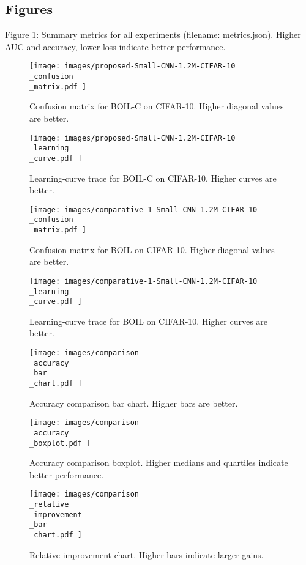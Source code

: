 \documentclass{article} %
\begin{document}
\subsection{Figures}
Figure 1: Summary metrics for all experiments (filename: metrics.json). Higher AUC and accuracy, lower loss indicate better performance.

\begin{figure}[H]
  \centering
  \texttt{[image:  images/proposed-Small-CNN-1.2M-CIFAR-10\\\_confusion\\\_matrix.pdf ]}
  \caption{Confusion matrix for BOIL-C on CIFAR-10. Higher diagonal values are better.}
\end{figure}

\begin{figure}[H]
  \centering
  \texttt{[image:  images/proposed-Small-CNN-1.2M-CIFAR-10\\\_learning\\\_curve.pdf ]}
  \caption{Learning-curve trace for BOIL-C on CIFAR-10. Higher curves are better.}
\end{figure}

\begin{figure}[H]
  \centering
  \texttt{[image:  images/comparative-1-Small-CNN-1.2M-CIFAR-10\\\_confusion\\\_matrix.pdf ]}
  \caption{Confusion matrix for BOIL on CIFAR-10. Higher diagonal values are better.}
\end{figure}

\begin{figure}[H]
  \centering
  \texttt{[image:  images/comparative-1-Small-CNN-1.2M-CIFAR-10\\\_learning\\\_curve.pdf ]}
  \caption{Learning-curve trace for BOIL on CIFAR-10. Higher curves are better.}
\end{figure}

\begin{figure}[H]
  \centering
  \texttt{[image:  images/comparison\\\_accuracy\\\_bar\\\_chart.pdf ]}
  \caption{Accuracy comparison bar chart. Higher bars are better.}
\end{figure}

\begin{figure}[H]
  \centering
  \texttt{[image:  images/comparison\\\_accuracy\\\_boxplot.pdf ]}
  \caption{Accuracy comparison boxplot. Higher medians and quartiles indicate better performance.}
\end{figure}

\begin{figure}[H]
  \centering
  \texttt{[image:  images/comparison\\\_relative\\\_improvement\\\_bar\\\_chart.pdf ]}
  \caption{Relative improvement chart. Higher bars indicate larger gains.}
\end{figure}
\end{document}
